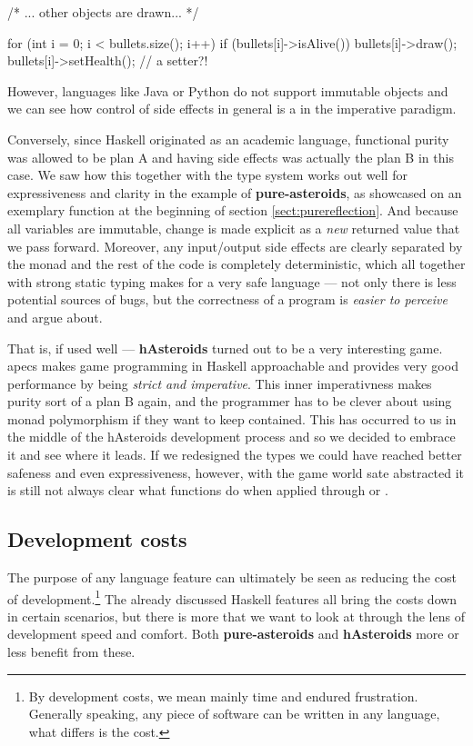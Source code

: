 \documentclass[
  digital, %
  color,   %
  table,   %
  oneside, %
  lof,     %
  lot,     %
]{fithesis3}
\begin{document}
{\begin{cppblock}
{    /* ... other objects are drawn... */
    
    for (int i = 0; i < bullets.size(); i++) {
        if (bullets[i]->isAlive()) {
            bullets[i]->draw();
            bullets[i]->setHealth(); // a setter?!
        }
    }
}
\end{cppblock}
However, languages like Java or Python do not support immutable objects
and we can see how control of side effects in general is a  in the imperative paradigm.

Conversely, since Haskell originated as an academic language,
functional purity was allowed to be plan A and having
side effects was actually the plan B in this case.
We saw how this together with the type system works out well for expressiveness and clarity
in the example of \textbf{pure-asteroids}, as showcased on an exemplary function
at the beginning of section \ref{sect:purereflection}.
And because all variables are immutable, change is made explicit as a \emph{new} returned value
that we pass forward.
Moreover, any input/output side effects are clearly separated by the  monad
and the rest of the code is completely deterministic, which all together with strong static typing
makes for a very safe language --- not only there is less potential sources of bugs, but the
correctness of a program is \emph{easier to perceive} and argue about.

That is, if used well --- \textbf{hAsteroids} turned out to be a very interesting game.
apecs makes game programming in Haskell approachable and provides
very good performance by being \emph{strict and imperative}. This inner imperativness
makes purity sort of a plan B again, and the programmer has to be clever about using monad polymorphism
if they want to keep  contained. This has occurred to us in the middle
of the hAsteroids development process and so we decided to embrace it and see where it leads.
If we redesigned the types we could have reached better safeness and even expressiveness, however,
with the game world sate abstracted it is still not always clear what functions do
when applied through  or .



\subsection{Development costs}

The purpose of any language feature can ultimately be seen as reducing the cost of development.\footnote{
By development costs, we mean mainly time and endured frustration. Generally speaking,
any piece of software can be written in any language, what differs is the cost.
}
The already discussed Haskell features all bring the costs down in certain scenarios, but there is more
that we want to look at through the lens of development speed and comfort.
Both \textbf{pure-asteroids} and \textbf{hAsteroids} more or less benefit from these.

}
\end{document}
